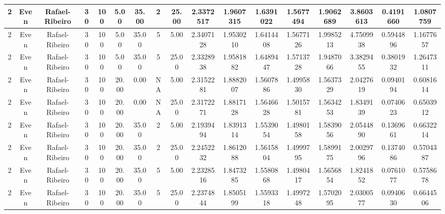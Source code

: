 \begin{longtable}{ | c | c | c | c | c | c | c | c | c | c | c | c | c | c | c | c | c | }
	\hline
	2	&	Even	&	Rafael-Ribeiro	&	30	&	100	&	5.00	&	35.00	&	2	&	25.00	&	2.3372517	&	1.9607315	&	1.6391022	&	1.5677494	&	1.9062689	&	3.8603613	&	0.4191660	&	1.0807759 \\
	\hline
	2	&	Even	&	Rafael-Ribeiro	&	30	&	100	&	5.00	&	35.00	&	5	&	5.00	&	2.3407128	&	1.9530210	&	1.6414408	&	1.5677126	&	1.9985213	&	4.7509938	&	0.5944896	&	1.1677657 \\
	\hline
	2	&	Even	&	Rafael-Ribeiro	&	30	&	100	&	5.00	&	35.00	&	5	&	25.00	&	2.3328938	&	1.9581882	&	1.6489447	&	1.5713728	&	1.9487066	&	3.3829455	&	0.3801932	&	1.2647311 \\
	\hline
	2	&	Even	&	Rafael-Ribeiro	&	30	&	100	&	20.00	&	0.00	&	NA	&	5.00	&	2.3152281	&	1.8882007	&	1.5607886	&	1.4995830	&	1.5637329	&	2.0427619	&	0.0940194	&	0.6081614 \\
	\hline
	2	&	Even	&	Rafael-Ribeiro	&	30	&	100	&	20.00	&	0.00	&	NA	&	25.00	&	2.3172271	&	1.8817128	&	1.5646628	&	1.5015781	&	1.5634253	&	1.8349139	&	0.0740623	&	0.6503912 \\
	\hline
	2	&	Even	&	Rafael-Ribeiro	&	30	&	100	&	20.00	&	35.00	&	2	&	5.00	&	2.1939494	&	1.8391314	&	1.5539054	&	1.4980158	&	1.5839056	&	2.0544890	&	0.1369661	&	0.6632214 \\
	\hline
	2	&	Even	&	Rafael-Ribeiro	&	30	&	100	&	20.00	&	35.00	&	2	&	25.00	&	2.2452232	&	1.8612088	&	1.5615804	&	1.4999795	&	1.5899175	&	2.0029796	&	0.1374086	&	0.5704387 \\
	\hline
	2	&	Even	&	Rafael-Ribeiro	&	30	&	100	&	20.00	&	35.00	&	5	&	5.00	&	2.2328516	&	1.8473285	&	1.5580868	&	1.4980417	&	1.5656854	&	1.8241852	&	0.0761077	&	0.5758678 \\
	\hline
	2	&	Even	&	Rafael-Ribeiro	&	30	&	100	&	20.00	&	35.00	&	5	&	25.00	&	2.2374844	&	1.8505199	&	1.5593318	&	1.4997248	&	1.5702095	&	2.0300577	&	0.0940630	&	0.6644506 \\
	\hline
\end{longtable}
\label{tab:results}
